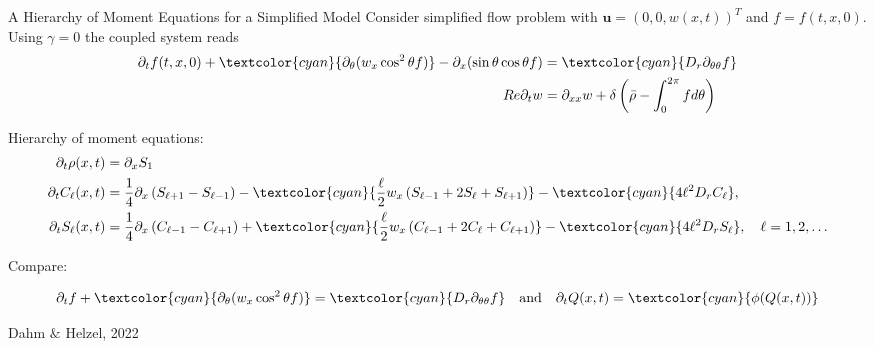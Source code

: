 \begin{frame}{A Hierarchy of Moment Equations for a Simplified Model}
	\scriptsize
	Consider simplified flow problem with $\boldsymbol{u} = (0,0, w(x,t))^T$ and $f=f(t,x,0)$. Using $\gamma = 0$ the coupled system reads
	\begin{align*}
		\partial_t f(t,x,0) +  \textcolor{cyan}{\partial_\theta(w_x \cos^2 \theta f)} - \partial_x (\sin \theta \cos \theta f) &=  \textcolor{cyan}{D_r \partial_{\theta\theta} f} \\
		R e \partial_t w &=\partial_{x x} w+\delta\left(\bar{\rho}-\int_0^{2 \pi} f d \theta\right)
	\end{align*}

	Hierarchy of moment equations:
	\begin{align*}
		\partial_t \rho(x, t) & = \partial_x S_1 \\
		\partial_t C_{\ell}(x, t) & = \frac{1}{4} \partial_x\left(S_{\ell+1}-S_{\ell-1}\right)- \textcolor{cyan}{\frac{\ell}{2} w_x\left(S_{\ell-1}+2 S_{\ell}+S_{\ell+1}\right)}- \textcolor{cyan}{4 \ell^2 D_r C_{\ell}}, \\
		\partial_t S_{\ell}(x, t) & =\frac{1}{4} \partial_x\left(C_{\ell-1}-C_{\ell+1}\right)+  \textcolor{cyan}{\frac{\ell}{2} w_x\left(C_{\ell-1}+2 C_{\ell}+C_{\ell+1}\right)}- \textcolor{cyan}{4 \ell^2 D_r S_{\ell}}, \quad \ell=1,2, \ldots
	\end{align*}

	Compare:
	
	\begin{align*}
		\partial_t f + \textcolor{cyan}{\partial_\theta(w_x \cos^2 \theta f)} = \textcolor{cyan}{D_r \partial_{\theta\theta} f} \quad \text{and} \quad \partial_t Q(x,t) = \textcolor{cyan}{\phi(Q(x,t))}
	\end{align*}
	
	\begin{beamercolorbox}[sep=1em,wd=\linewidth,right]{}
		\tiny{Dahm $\&$ Helzel, 2022}
	\end{beamercolorbox}
\end{frame}



